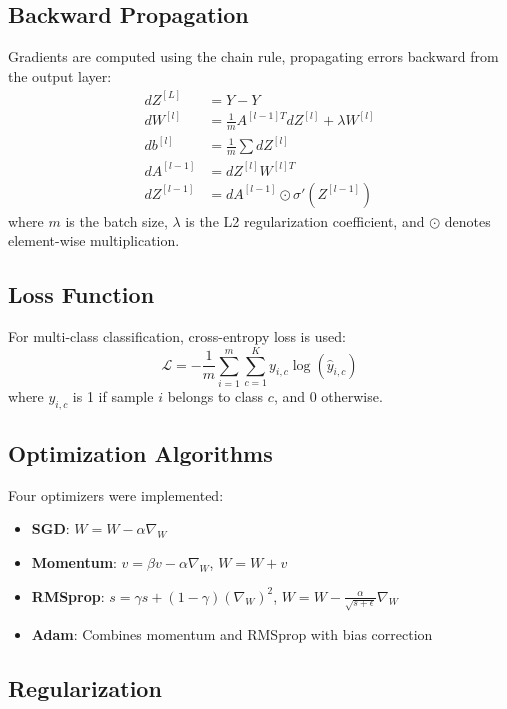 \documentclass[11pt,a4paper]{article}
\begin{document}
\subsection{Backward Propagation}

Gradients are computed using the chain rule, propagating errors backward from the output layer:
\begin{align}
dZ^{[L]} &= \hat{Y} - Y \\
dW^{[l]} &= \frac{1}{m} A^{[l-1]T} dZ^{[l]} + \lambda W^{[l]} \\
db^{[l]} &= \frac{1}{m} \sum dZ^{[l]} \\
dA^{[l-1]} &= dZ^{[l]} W^{[l]T} \\
dZ^{[l-1]} &= dA^{[l-1]} \odot \sigma'(Z^{[l-1]})
\end{align}
where $m$ is the batch size, $\lambda$ is the L2 regularization coefficient, and $\odot$ denotes element-wise multiplication.

\subsection{Loss Function}

For multi-class classification, cross-entropy loss is used:
\begin{equation}
\mathcal{L} = -\frac{1}{m} \sum_{i=1}^{m} \sum_{c=1}^{K} y_{i,c} \log(\hat{y}_{i,c})
\end{equation}
where $y_{i,c}$ is 1 if sample $i$ belongs to class $c$, and 0 otherwise.

\subsection{Optimization Algorithms}

Four optimizers were implemented:
\begin{itemize}
\item \textbf{SGD}: $W = W - \alpha \nabla_W$
\item \textbf{Momentum}: $v = \beta v - \alpha \nabla_W$, $W = W + v$
\item \textbf{RMSprop}: $s = \gamma s + (1-\gamma)(\nabla_W)^2$, $W = W - \frac{\alpha}{\sqrt{s+\epsilon}} \nabla_W$
\item \textbf{Adam}: Combines momentum and RMSprop with bias correction
\end{itemize}

\subsection{Regularization}
\end{document}
